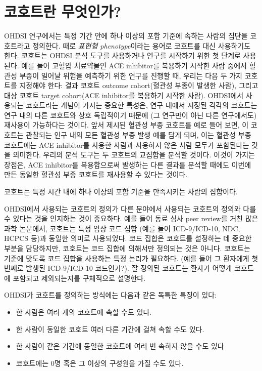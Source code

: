 \documentclass[10.5pt]{book}
\providecommand{\tightlist}{%
  \setlength{\itemsep}{0pt}\setlength{\parskip}{0pt}}
\theoremstyle{definition}
\theoremstyle{definition}
\theoremstyle{definition}
\theoremstyle{remark}
\let\BeginKnitrBlock\begin \let\EndKnitrBlock\end
\begin{document}
\section{코호트란 무엇인가?}\label{-}

OHDSI 연구에서는 특정 기간 안에 하나 이상의 포함 기준에 속하는 사람의
집단을 코호트라고 정의한다. 때로 \emph{표현형 phenotype}이라는 용어로
코호트를 대신 사용하기도 한다. 코호트는 OHDSI 분석 도구를 사용하거나
연구를 시작하기 위한 첫 단계로 사용된다. 예를 들어 고혈압 치료약물인 ACE
inhibitor를 복용하기 시작한 사람 중에서 혈관성 부종이 일어날 위험을
예측하기 위한 연구를 진행할 때, 우리는 다음 두 가지 코호트를 지정해야
한다: 결과 코호트 outcome cohort(혈관성 부종이 발생한 사람), 그리고 대상
코호트 target cohort(ACE inhibitor를 복용하기 시작한 사람). OHDSI에서
사용되는 코호트라는 개념이 가지는 중요한 특성은, 연구 내에서 지정된
각각의 코호트는 연구 내의 다른 코호트와 상호 독립적이기 때문에 (그
연구만이 아닌 다른 연구에서도) 재사용이 가능하다는 것이다. 앞서 제시된
혈관성 부종 코호트를 예로 들어 보면, 이 코호트는 관찰되는 인구 내의 모든
혈관성 부종 발생 예를 담게 되며, 이는 혈관성 부종 코호트에는 ACE
inhibitor를 사용한 사람과 사용하지 않은 사람 모두가 포함된다는 것을
의미한다. 우리의 분석 도구는 두 코호트의 교집합을 분석할 것이다. 이것이
가지는 장점은, ACE inhibitor를 복용함으로써 발생하는 다른 결과를 분석할
때에도 이번에 만든 동일한 혈관성 부종 코호트를 재사용할 수 있다는
것이다.

\BeginKnitrBlock{rmdimportant}
코호트는 특정 시간 내에 하나 이상의 포함 기준을 만족시키는 사람의
집합이다.
\EndKnitrBlock{rmdimportant}

  OHDSI에서 사용되는 코호트의
정의가 다른 분야에서 사용되는 코호트의 정의와 다를 수 있다는 것을
인지하는 것이 중요하다. 예를 들어 동료 심사 peer review를 거친 많은 과학
논문에서, 코호트는 특정 임상 코드 집합 (예를 들어 ICD-9/ICD-10, NDC,
HCPCS 등)과 동일한 의미로 사용되었다. 코드 집합은 코호트를 설정하는 데
중요한 부분을 담당하지만, 코호트는 코드 집합에 의해서만 정의되는 것은
아니다. 코호트는 기준에 맞도록 코드 집합을 사용하는 특정 논리가
필요하다. (예를 들어 그 환자에게 첫 번째로 발생된 ICD-9/ICD-10
코드인가?). 잘 정의된 코호트는 환자가 어떻게 코호트에 포함되고
제외되는지를 구체적으로 설명한다. 

 OHDSI가 코호트를 정의하는 방식에는 다음과 같은 독특한
특징이 있다:

\begin{itemize}
\tightlist
\item
  한 사람은 여러 개의 코호트에 속할 수도 있다.
\item
  한 사람이 동일한 코호트 여러 다른 기간에 걸쳐 속할 수도 있다.
\item
  한 사람이 같은 기간에 동일한 코호트에 여러 번 속하지 않을 수도 있다
\item
  코호트에는 0명 혹은 그 이상의 구성원을 가질 수도 있다.
\end{itemize}
\end{document}
